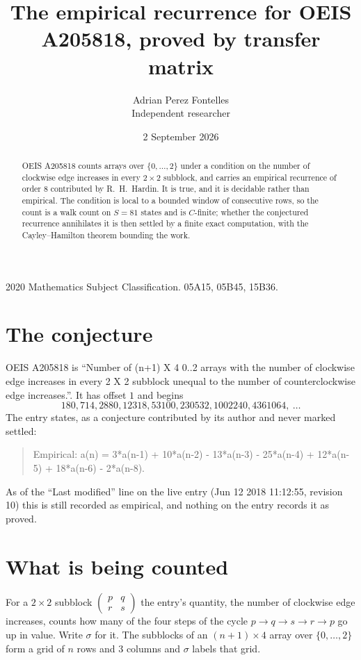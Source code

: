 \documentclass[11pt,a4paper]{article}
\title{The empirical recurrence for OEIS A205818, proved by transfer matrix}
\author{Adrian Perez Fontelles\\ \small Independent researcher}
\date{2 September 2026}
\theoremstyle{plain}
\theoremstyle{definition}
\begin{document}
\maketitle

\begin{abstract}
OEIS A205818 counts arrays over $\{0,\dots,2\}$ under a condition on the number of clockwise edge increases
in every $2\times2$ subblock, and carries an empirical recurrence of order $8$ contributed by
R.~H.~Hardin. It is true, and it is decidable rather than empirical. The condition is local to
a bounded window of consecutive rows, so the count is a walk count on $S=81$ states and is
$C$-finite; whether the conjectured recurrence annihilates it is then settled by a finite exact
computation, with the Cayley--Hamilton theorem bounding the work.
\end{abstract}

\noindent\small 2020 Mathematics Subject Classification. 05A15, 05B45, 15B36.\normalsize

\section{The conjecture}

OEIS A205818 is ``Number of (n+1) X 4 0..2 arrays with the number of clockwise edge increases in every 2 X 2 subblock unequal to the number of counterclockwise edge increases.''. It has offset $1$ and begins
\[
180, 714, 2880, 12318, 53100, 230532, 1002240, 4361064,\ \dots
\]
The entry states, as a conjecture contributed by its author and never marked settled:
\begin{quote}
Empirical: a(n) = 3*a(n-1) + 10*a(n-2) - 13*a(n-3) - 25*a(n-4) + 12*a(n-5) + 18*a(n-6) - 2*a(n-8).
\end{quote}
As of the ``Last modified'' line on the live entry (Jun 12 2018 11:12:55, revision 10) this is still
recorded as empirical, and nothing on the entry records it as proved.

\section{What is being counted}

For a $2\times2$ subblock $\begin{pmatrix}p&q\\r&s\end{pmatrix}$ the
entry's quantity, the number of clockwise edge increases, counts how many of the four steps of the cycle $p\to q\to s\to r\to p$ go up in value. Write $\sigma$ for it. The subblocks of an
$(n+1)\times4$ array over $\{0,\dots,2\}$ form a grid of $n$ rows and $3$
columns and $\sigma$ labels that grid.
\end{document}

